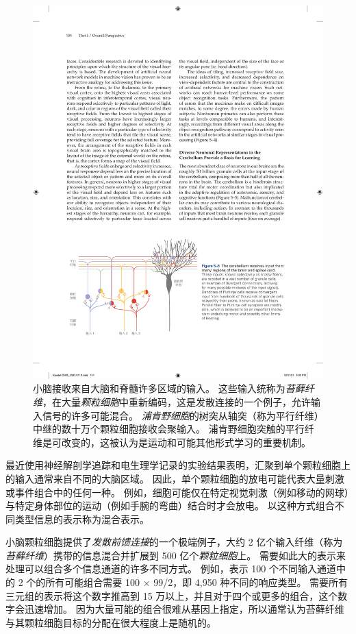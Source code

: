 \begin{figure}[htbp]
	\centering
	\includegraphics[width=0.9\linewidth]{chap05/fig_5_5}
	\caption{小脑接收来自大脑和脊髓许多区域的输入。
		这些输入统称为\textit{苔藓纤维}，在大量\textit{颗粒细胞}中重新编码，这是发散连接的一个例子，允许输入信号的许多可能混合。
		\textit{浦肯野细胞}的树突从轴突（称为平行纤维）中继的数十万个颗粒细胞接收会聚输入。
		浦肯野细胞突触的平行纤维是可改变的，这被认为是运动和可能其他形式学习的重要机制。}
	\label{fig:5_5}
\end{figure}


最近使用神经解剖学追踪和电生理学记录的实验结果表明，汇聚到单个颗粒细胞上的输入通常来自不同的大脑区域。
因此，单个颗粒细胞的放电可能代表大量刺激或事件组合中的任何一种。
例如，细胞可能仅在特定视觉刺激（例如移动的网球）与特定身体部位的运动（例如手腕的弯曲）结合时才会放电。
以这种方式组合不同类型信息的表示称为混合表示。


小脑颗粒细胞提供了\textit{发散前馈连接}的一个极端例子，大约 2 亿个输入纤维（称为\textit{苔藓纤维}）携带的信息混合并扩展到 500 亿个\textit{颗粒细胞}上。
需要如此大的表示来处理可以组合多个信息通道的许多不同方式。
例如，表示 100 个不同输入通道中的 2 个的所有可能组合需要 100 × 99/2，即 4,950 种不同的响应类型。
需要所有三元组的表示将这个数字推高到 15 万以上，并且对于四个或更多的组合，这个数字会迅速增加。
因为大量可能的组合很难从基因上指定，所以通常认为苔藓纤维与其颗粒细胞目标的分配在很大程度上是随机的。


